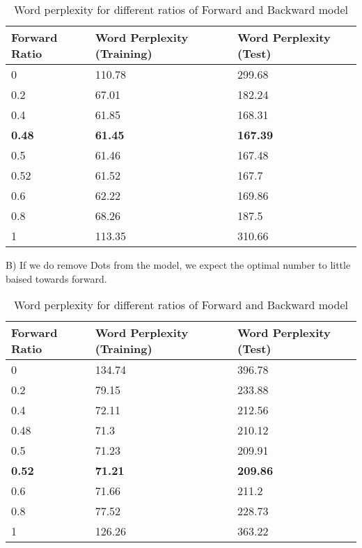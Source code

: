 \begin{center}	
    \begin{table}[ht]
    \centering
    \begin{tabular}{| l | l | l |}
    \hline
    Forward Ratio  &  Word Perplexity (Training) & Word Perplexity (Test)   \\ \hline
0 &	110.78 &	299.68 \\ \hline
0.2 & 	67.01 & 182.24  \\ \hline
0.4 & 	61.85 & 	168.31 \\ \hline
{\bfseries 0.48} & 	{\bfseries 61.45}	 & {\bfseries 167.39}\\ \hline
0.5	 & 61.46 & 	167.48 \\ \hline
0.52 & 	61.52 & 	167.7 \\ \hline
0.6 & 	62.22 & 	169.86 \\ \hline
0.8 & 	68.26 & 	187.5 \\ \hline
1 & 	113.35 & 	310.66 \\ \hline
    \end{tabular}
    \caption{Word perplexity for different ratios of Forward and Backward model}
    \end{table}%
\end{center}

B) If we do remove Dots from the model, we expect the optimal number to little baised towards forward. 

\begin{center}	
    \begin{table}[ht]
    \centering
    \begin{tabular}{| l | l | l |}
    \hline
    Forward Ratio  &  Word Perplexity (Training) & Word Perplexity (Test)   \\ \hline
0 &	134.74  & 396.78 \\ \hline
0.2	& 79.15 &	233.88 \\ \hline
0.4 & 72.11 &	212.56 \\ \hline
0.48	 & 71.3	 & 210.12 \\ \hline
0.5 & 71.23 &	209.91 \\ \hline
{\bfseries 0.52} & {\bfseries 71.21} & {\bfseries 209.86}\\ \hline
0.6	 & 71.66	 & 211.2\\ \hline
0.8 & 	77.52	 & 228.73\\ \hline
1	 & 126.26	 & 363.22\\ \hline
    \end{tabular}
    \caption{Word perplexity for different ratios of Forward and Backward model}
    \end{table}%
\end{center}

